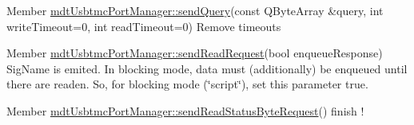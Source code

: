 \label{todo__todo000037}
\hypertarget{todo__todo000037}{}
 
\begin{DoxyDescription}
\item[Member \hyperlink{classmdt_usbtmc_port_manager_a858590909ce63319a3390140c4d0a6ca}{mdtUsbtmcPortManager::sendQuery}(const QByteArray \&query, int writeTimeout=0, int readTimeout=0) ]Remove timeouts 
\end{DoxyDescription}

\label{todo__todo000043}
\hypertarget{todo__todo000043}{}
 
\begin{DoxyDescription}
\item[Member \hyperlink{classmdt_usbtmc_port_manager_ab1604a1c8f2e9192714d039dbf9a5158}{mdtUsbtmcPortManager::sendReadRequest}(bool enqueueResponse) ]SigName is emited. In blocking mode, data must (additionally) be enqueued until there are readen. So, for blocking mode (\char`\"{}script\char`\"{}), set this parameter true. 
\end{DoxyDescription}

\label{todo__todo000038}
\hypertarget{todo__todo000038}{}
 
\begin{DoxyDescription}
\item[Member \hyperlink{classmdt_usbtmc_port_manager_a7bcc280bd4a26ed523832550b1e61553}{mdtUsbtmcPortManager::sendReadStatusByteRequest}() ]finish ! 
\end{DoxyDescription}